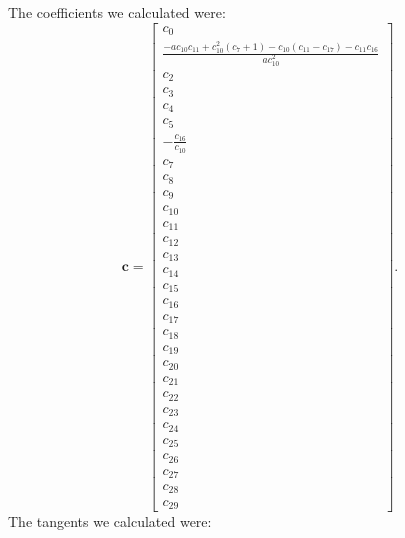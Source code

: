 \documentclass{article}
\begin{document}
The coefficients we calculated were:
\begin{equation}
\mathbf{c}=\left[\begin{matrix}c_{0}\\\frac{- a c_{10} c_{11} + c_{10}^{2} \left(c_{7} + 1\right) - c_{10} \left(c_{11} - c_{17}\right) - c_{11} c_{16}}{a c_{10}^{2}}\\c_{2}\\c_{3}\\c_{4}\\c_{5}\\- \frac{c_{16}}{c_{10}}\\c_{7}\\c_{8}\\c_{9}\\c_{10}\\c_{11}\\c_{12}\\c_{13}\\c_{14}\\c_{15}\\c_{16}\\c_{17}\\c_{18}\\c_{19}\\c_{20}\\c_{21}\\c_{22}\\c_{23}\\c_{24}\\c_{25}\\c_{26}\\c_{27}\\c_{28}\\c_{29}\end{matrix}\right].
\end{equation}
The tangents we calculated were:
\end{document}
